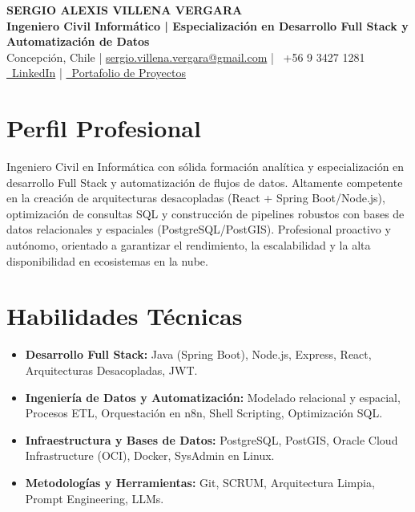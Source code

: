 \documentclass[a4paper,10pt]{article}
\begin{document}
\begin{center}
    {\Huge \textbf{SERGIO ALEXIS VILLENA VERGARA}} \\[0.2cm]
    {\Large \textbf{Ingeniero Civil Informático | Especialización en Desarrollo Full Stack y Automatización de Datos}} \\[0.2cm]
    \small
    \faMapMarker* Concepción, Chile \quad | \quad 
    \faEnvelope \href{mailto:sergio.villena.vergara@gmail.com}{ sergio.villena.vergara@gmail.com} \quad | \quad 
    \faPhone \ +56 9 3427 1281 \\
    \href{https://linkedin.com/in/sergio-villena}{\faLinkedin \ LinkedIn} \quad | \quad 
    \href{https://github.com/SAVillena}{\faGlobe \ Portafolio de Proyectos}
\end{center}

\section{Perfil Profesional}
Ingeniero Civil en Informática con sólida formación analítica y especialización en desarrollo Full Stack y automatización de flujos de datos. Altamente competente en la creación de arquitecturas desacopladas (React + Spring Boot/Node.js), optimización de consultas SQL y construcción de pipelines robustos con bases de datos relacionales y espaciales (PostgreSQL/PostGIS). Profesional proactivo y autónomo, orientado a garantizar el rendimiento, la escalabilidad y la alta disponibilidad en ecosistemas en la nube.

\section{Habilidades Técnicas}
\begin{itemize}[leftmargin=*, noitemsep]
    \item \textbf{Desarrollo Full Stack:} Java (Spring Boot), Node.js, Express, React, Arquitecturas Desacopladas, JWT.
    \item \textbf{Ingeniería de Datos y Automatización:} Modelado relacional y espacial, Procesos ETL, Orquestación en n8n, Shell Scripting, Optimización SQL.
    \item \textbf{Infraestructura y Bases de Datos:} PostgreSQL, PostGIS, Oracle Cloud Infrastructure (OCI), Docker, SysAdmin en Linux.
    \item \textbf{Metodologías y Herramientas:} Git, SCRUM, Arquitectura Limpia, Prompt Engineering, LLMs.
\end{itemize}
\end{document}
